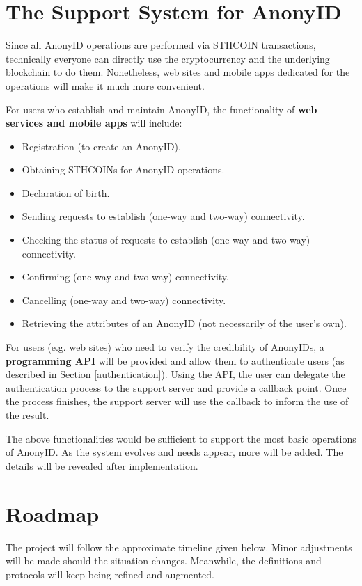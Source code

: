 \documentclass[12pt, a4paper]{article}
\begin{document}
\section{The Support System for AnonyID}

Since all AnonyID operations are performed via STHCOIN transactions, technically everyone can directly use the cryptocurrency and the underlying blockchain to do them. Nonetheless, web sites and mobile apps dedicated for the operations will make it much more convenient. 

For users who establish and maintain AnonyID, the functionality of \textbf{web services and mobile apps} will include: 

\begin{itemize}
\item Registration (to create an AnonyID).
\item Obtaining STHCOINs for AnonyID operations.
\item Declaration of birth.
\item Sending requests to establish (one-way and two-way) connectivity.
\item Checking the status of requests to establish (one-way and two-way) connectivity.
\item Confirming (one-way and two-way) connectivity.
\item Cancelling (one-way and two-way) connectivity.
\item Retrieving the attributes of an AnonyID (not necessarily of the user's own).
\end{itemize}

For users (e.g. web sites) who need to verify the credibility of AnonyIDs, a \textbf{programming API} will be provided and allow them to authenticate users (as described in Section \ref{authentication}). Using the API, the user can delegate the authentication process to the support server and provide a callback point. Once the process finishes, the support server will use the callback to inform the use of the result.

The above functionalities would be sufficient to support the most basic operations of AnonyID. As the system evolves and needs appear, more will be added. The details will be revealed after implementation.

\section{Roadmap}

The project will follow the approximate timeline given below. Minor adjustments will be made should the situation changes. Meanwhile, the definitions and protocols will keep being refined and augmented. 
\end{document}
